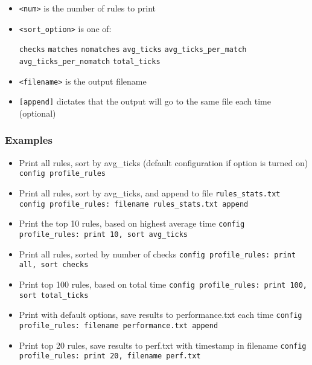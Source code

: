 \documentclass[english]{report}
\begin{document}
\begin{itemize}
\item \texttt{<num>} is the number of rules to print
\item \texttt{<sort\_option>} is one of:

    \subitem \texttt{checks}
    \subitem \texttt{matches}
    \subitem \texttt{nomatches}
    \subitem \texttt{avg\_ticks}
    \subitem \texttt{avg\_ticks\_per\_match}
    \subitem \texttt{avg\_ticks\_per\_nomatch}
    \subitem \texttt{total\_ticks}

\item \texttt{<filename>} is the output filename

\item \texttt{[append]} dictates that the output will go to the same file each
time (optional)

\end{itemize}

\subsubsection{Examples}
\begin{itemize}

\item Print all rules, sort by avg\_ticks (default configuration if option is turned on)
\subitem \texttt{config profile\_rules}

\item Print all rules, sort by avg\_ticks, and append to file \texttt{rules\_stats.txt} 
\subitem \texttt{config profile\_rules: filename \texttt{rules\_stats.txt} append}

\item Print the top 10 rules, based on highest average time
\subitem \texttt{config profile\_rules: print 10, sort avg\_ticks}

\item Print all rules, sorted by number of checks
\subitem \texttt{config profile\_rules: print all, sort checks}

\item Print top 100 rules, based on total time
\subitem \texttt{config profile\_rules: print 100, sort total\_ticks}

\item Print with default options, save results to performance.txt each time
\subitem \texttt{config profile\_rules: filename performance.txt append}

\item Print top 20 rules, save results to perf.txt with timestamp in filename
\subitem \texttt{config profile\_rules: print 20, filename perf.txt}

\end{itemize}
\end{document}
